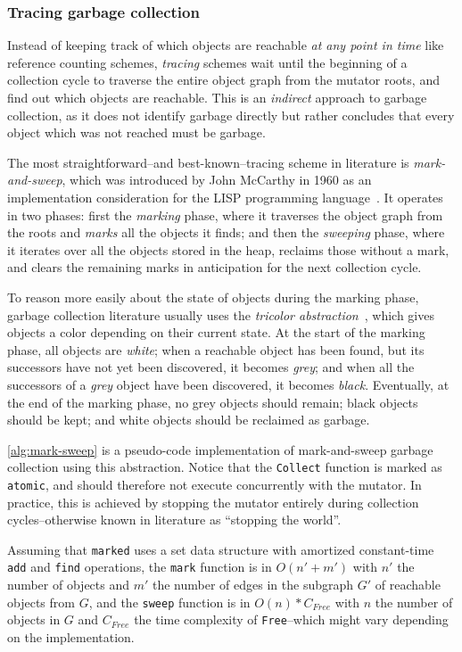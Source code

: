 \subsubsection{Tracing garbage collection}

Instead of keeping track of which objects are reachable \emph{at any point in time} like reference counting schemes, \emph{tracing} schemes wait until the beginning of a collection cycle to traverse the entire object graph from the mutator roots, and find out which objects are reachable. This is an \emph{indirect} approach to garbage collection, as it does not identify garbage directly but rather concludes that every object which was not reached must be garbage.

The most straightforward--and best-known--tracing scheme in literature is \emph{mark-and-sweep}, which was introduced by John McCarthy in 1960 as an implementation consideration for the LISP programming language~\cite{mccarthy60}. It operates in two phases: first the \emph{marking} phase, where it traverses the object graph from the roots and \emph{marks} all the objects it finds; and then the \emph{sweeping} phase, where it iterates over all the objects stored in the heap, reclaims those without a mark, and clears the remaining marks in anticipation for the next collection cycle.

To reason more easily about the state of objects during the marking phase, garbage collection literature usually uses the \emph{tricolor abstraction}~\cite{dijkstra78}, which gives objects a color depending on their current state. At the start of the marking phase, all objects are \emph{white}; when a reachable object has been found, but its successors have not yet been discovered, it becomes \emph{grey}; and when all the successors of a \emph{grey} object have been discovered, it becomes \emph{black}. Eventually, at the end of the marking phase, no grey objects should remain; black objects should be kept; and white objects should be reclaimed as garbage.

\cref{alg:mark-sweep} is a pseudo-code implementation of mark-and-sweep garbage collection using this abstraction. Notice that the \texttt{Collect} function is marked as \texttt{atomic}, and should therefore not execute concurrently with the mutator. In practice, this is achieved by stopping the mutator entirely during collection cycles--otherwise known in literature as ``stopping the world''.



\bigskip
Assuming that \texttt{marked} uses a set data structure with amortized constant-time \texttt{add} and \texttt{find} operations, the \texttt{mark} function is in \(O(n' + m')\) with \(n'\) the number of objects and \(m'\) the number of edges in the subgraph \(G'\) of reachable objects from \(G\), and the \texttt{sweep} function is in \(O(n) * C_{Free}\) with \(n\) the number of objects in \(G\) and \(C_{Free}\) the time complexity of \texttt{Free}--which might vary depending on the implementation.

